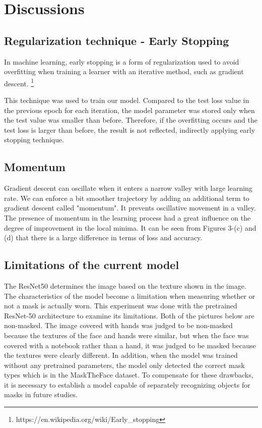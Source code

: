 \documentclass{article}
\begin{document}
\section{Discussions}

\subsection{Regularization technique - Early Stopping}
In machine learning, early stopping is a form of regularization used to avoid overfitting when training a learner with an iterative method, such as gradient descent.
\footnote[3] {https://en.wikipedia.org/wiki/Early\_stopping}

This technique was used to train our model. Compared to the test loss value in the previous epoch for each iteration, the model parameter was stored only when the test value was smaller than before.
Therefore, if the overfitting occurs and the test loss is larger than before, the result is not reflected, indirectly applying early stopping technique.

\subsection{Momentum}
Gradient descent can oscillate when it enters a narrow valley with large learning rate.
We can enforce a bit smoother trajectory by adding an additional term to gradient descent called "momentum".
It prevents oscillative movement in a valley.
The presence of momentum in the learning process had a great influence on the degree of improvement in the local minima.
It can be seen from Figures 3-(c) and (d) that there is a large difference in terms of loss and accuracy.

\subsection{Limitations of the current model}
The ResNet50 determines the image based on the texture shown in the image.
The characteristics of the model become a limitation when measuring whether or not a mask is actually worn.
This experiment was done with the pretrained ResNet-50 architecture to examine its limitations.
Both of the pictures below are non-masked.
The image covered with hands was judged to be non-masked because the textures of the face and hands were similar, but when the face was covered with a notebook rather than a hand, it was judged to be masked because the textures were clearly different.
In addition, when the model was trained without any pretrained parameters, the model only detected the correct mask types which is in the MaskTheFace dataset.
To compensate for these drawbacks, it is necessary to establish a model capable of separately recognizing objects for masks in future studies.
\end{document}
